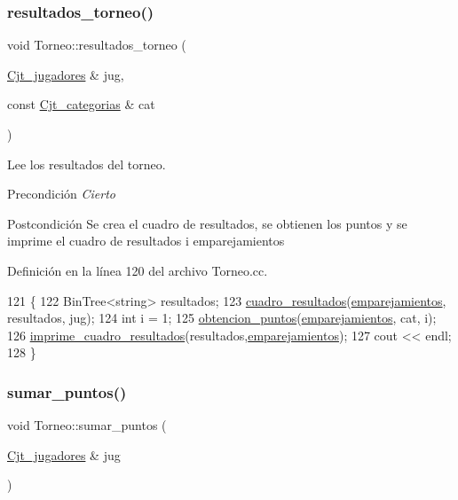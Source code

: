 \subsubsection{\texorpdfstring{resultados\+\_\+torneo()}{resultados\_torneo()}}
{\footnotesize\ttfamily void Torneo\+::resultados\+\_\+torneo (\begin{DoxyParamCaption}\item[{\hyperlink{class_cjt__jugadores}{Cjt\+\_\+jugadores} \&}]{jug,  }\item[{const \hyperlink{class_cjt__categorias}{Cjt\+\_\+categorias} \&}]{cat }\end{DoxyParamCaption})}



Lee los resultados del torneo. 

\begin{DoxyPrecond}{Precondición}
{\itshape Cierto} 
\end{DoxyPrecond}
\begin{DoxyPostcond}{Postcondición}
Se crea el cuadro de resultados, se obtienen los puntos y se imprime el cuadro de resultados i emparejamientos 
\end{DoxyPostcond}


Definición en la línea 120 del archivo Torneo.\+cc.


\begin{DoxyCode}
121 \{
122   BinTree<string> resultados;
123   \hyperlink{class_torneo_a64eda02f7720674f1808521d5547c02a}{cuadro\_resultados}(\hyperlink{class_torneo_a18e1c1f6f9f658bc2c2390d3e2a9a853}{emparejamientos}, resultados, jug);
124   \textcolor{keywordtype}{int} i = 1;
125   \hyperlink{class_torneo_a5ee0c8ca296bf422d040b05c768f7ba0}{obtencion\_puntos}(\hyperlink{class_torneo_a18e1c1f6f9f658bc2c2390d3e2a9a853}{emparejamientos}, cat, i);
126   \hyperlink{class_torneo_aa42b2460bffdc5e1e85f7ebff4a5a6d0}{imprime\_cuadro\_resultados}(resultados,\hyperlink{class_torneo_a18e1c1f6f9f658bc2c2390d3e2a9a853}{emparejamientos});
127   cout << endl;
128 \}
\end{DoxyCode}
\mbox{\label{class_torneo_af3d9ca7a6edf9bbf20a2af3b60bf23fc}} 
\subsubsection{\texorpdfstring{sumar\+\_\+puntos()}{sumar\_puntos()}}
{\footnotesize\ttfamily void Torneo\+::sumar\+\_\+puntos (\begin{DoxyParamCaption}\item[{\hyperlink{class_cjt__jugadores}{Cjt\+\_\+jugadores} \&}]{jug }\end{DoxyParamCaption})}



